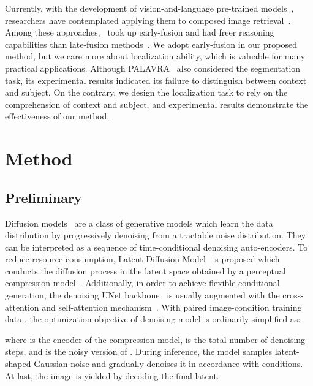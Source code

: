 \documentclass[letterpaper]{article} \usepackage[submission]{aaai24}  \usepackage{times}  \usepackage{helvet}  \usepackage{courier}  \usepackage[hyphens]{url}  \usepackage{graphicx} \urlstyle{rm} \def\UrlFont{\rm}  \usepackage{natbib}  \usepackage{caption} \frenchspacing  \setlength{\pdfpagewidth}{8.5in} \setlength{\pdfpageheight}{11in} \usepackage{algorithm}
\begin{document}
Currently, with the development of vision-and-language pre-trained models~\cite{vilbert, clip}, researchers have contemplated applying them to composed image retrieval~\cite{CIRR, FashionVLP, pic2word, PALAVRA}.
Among these approaches,~\cite{pic2word, PALAVRA} took up early-fusion and had freer reasoning capabilities than late-fusion methods~\cite{CIRR, FashionVLP}.
We adopt early-fusion in our proposed method, but we care more about localization ability, which is valuable for many practical applications.
Although PALAVRA~\cite{PALAVRA} also considered the segmentation task, its experimental results indicated its failure to distinguish between context and subject.
On the contrary, we design the localization task to rely on the comprehension of context and subject, and experimental results demonstrate the effectiveness of our method.







\section{Method}
\label{sec:method}

\subsection{Preliminary}
\label{sec:preliminary}

Diffusion models~\cite{ddpm, score} are a class of generative models which learn the data distribution by progressively denoising from a tractable noise distribution.
They can be interpreted as a sequence of time-conditional denoising auto-encoders.
To reduce resource consumption, Latent Diffusion Model~\cite{stablediffusion} is proposed which conducts the diffusion process in the latent space obtained by a perceptual compression model~\cite{vqgan}.
Additionally, in order to achieve flexible conditional generation, the denoising UNet backbone~\cite{unet} is usually augmented with the cross-attention and self-attention mechanism~\cite{transformer}.
With paired image-condition training data , the optimization objective of denoising model  is ordinarily simplified as:

where  is the encoder of the compression model,  is the total number of denoising steps, and  is the noisy version of .
During inference, the model samples latent-shaped Gaussian noise and gradually denoises it in accordance with conditions.
At last, the image is yielded by decoding the final latent.
\end{document}
